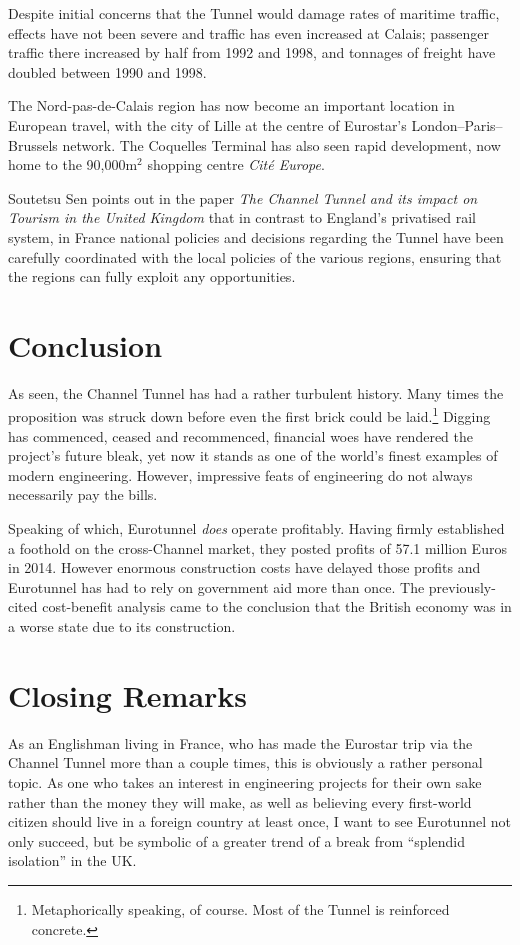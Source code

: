 \documentclass[12pt]{article} %
\begin{document}
Despite initial concerns that the Tunnel would damage rates of maritime traffic, effects have not been severe and traffic has even increased at Calais; passenger traffic there increased by half from 1992 and 1998, and tonnages of freight have doubled between 1990 and 1998.

The Nord-pas-de-Calais region has now become an important location in European travel, with the city of Lille at the centre of Eurostar's London--Paris--Brussels network. The Coquelles Terminal has also seen rapid development, now home to the 90,000m$^2$ shopping centre \emph{Cité Europe}.

Soutetsu Sen points out in the paper \emph{The Channel Tunnel and its impact on Tourism in the United Kingdom}\cite{sen04} that in contrast to England's privatised rail system, in France national policies and decisions regarding the Tunnel have been carefully coordinated with the local policies of the various regions, ensuring that the regions can fully exploit any opportunities.

\section{Conclusion}
As seen, the Channel Tunnel has had a rather turbulent history. Many times the proposition was struck down before even the first brick could be laid.\footnote{Metaphorically speaking, of course. Most of the Tunnel is reinforced concrete.} Digging has commenced, ceased and recommenced, financial woes have rendered the project's future bleak, yet now it stands as one of the world's finest examples of modern engineering. However, impressive feats of engineering do not always necessarily pay the bills.

Speaking of which, Eurotunnel \emph{does} operate profitably. Having firmly established a foothold on the cross-Channel market, they posted profits of 57.1 million Euros in 2014. However enormous construction costs have delayed those profits and Eurotunnel has had to rely on government aid more than once. The previously-cited cost-benefit analysis came to the conclusion that the British economy was in a worse state due to its construction.\cite{costeval}

\section{Closing Remarks}
As an Englishman living in France, who has made the Eurostar trip via the Channel Tunnel more than a couple times, this is obviously a rather personal topic. As one who takes an interest in engineering projects for their own sake rather than the money they will make, as well as believing every first-world citizen should live in a foreign country at least once, I want to see Eurotunnel not only succeed, but be symbolic of a greater trend of a break from ``splendid isolation'' in the UK.
\end{document}
